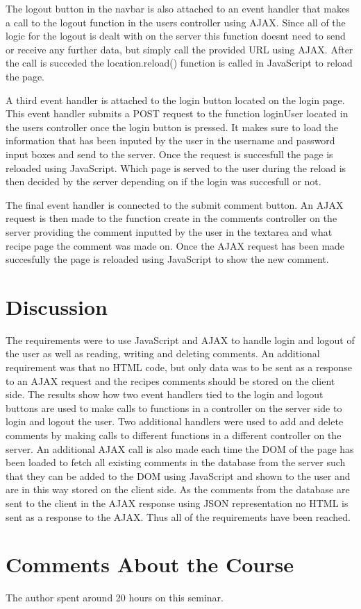 \documentclass[a4paper]{scrartcl}
\begin{document}
The logout button in the navbar is also attached to an event handler \citet{kimblad_git_2019_54} that makes a call to the logout function in the users controller using AJAX. Since all of the logic for the logout is dealt with on the server this function doesnt need to send or receive any further data, but simply call the provided URL using AJAX. After the call is succeded the location.reload() function is called in JavaScript to reload the page.

A third event handler \citet{kimblad_git_2019_40} is attached to the login button located on the login page. This event handler submits a POST request to the function loginUser located in the users controller once the login button is pressed. It makes sure to load the information that has been inputed by the user in the username and password input boxes and send to the server. Once the request is succesfull the page is reloaded using JavaScript. Which page is served to the user during the reload is then decided by the server depending on if the login was succesfull or not.  

The final event handler \citet{kimblad_git_2019_8} is connected to the submit comment button. An AJAX request is then made to the function create in the comments controller on the server providing the comment inputted by the user in the textarea and what recipe page the comment was made on. Once the AJAX request has been made succesfully the page is reloaded using JavaScript to show the new comment.

\section{Discussion}
The requirements were to use JavaScript and AJAX to handle login and logout of the user as well as reading, writing and deleting comments. An additional requirement was that no HTML code, but only data was to be sent as a response to an AJAX request and the recipes comments should be stored on the client side. The results show how two event handlers tied to the login and logout buttons are used to make calls to functions in a controller on the server side to login and logout the user. Two additional handlers were used to add and delete comments by making calls to different functions in a different controller on the server. An additional AJAX call is also made each time the DOM of the page has been loaded to fetch all existing comments in the database from the server such that they can be added to the DOM using JavaScript and shown to the user and are in this way stored on the client side. As the comments from the database are sent to the client in the AJAX response using JSON representation no HTML is sent as a response to the AJAX. Thus all of the requirements have been reached.


\section{Comments About the Course}
The author spent around 20 hours on this seminar.

\printbibliography
\end{document}
